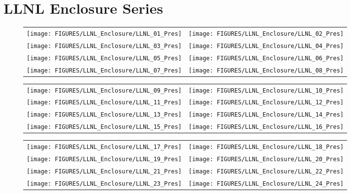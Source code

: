 \section{LLNL Enclosure Series}

\begin{figure}[p]
\begin{tabular*}{\textwidth}{l@{\extracolsep{\fill}}r}
\texttt{[image: FIGURES/LLNL\_Enclosure/LLNL\_01\_Pres]} &
\texttt{[image: FIGURES/LLNL\_Enclosure/LLNL\_02\_Pres]} \\
\texttt{[image: FIGURES/LLNL\_Enclosure/LLNL\_03\_Pres]} &
\texttt{[image: FIGURES/LLNL\_Enclosure/LLNL\_04\_Pres]} \\
\texttt{[image: FIGURES/LLNL\_Enclosure/LLNL\_05\_Pres]} &
\texttt{[image: FIGURES/LLNL\_Enclosure/LLNL\_06\_Pres]} \\
\texttt{[image: FIGURES/LLNL\_Enclosure/LLNL\_07\_Pres]} &
\texttt{[image: FIGURES/LLNL\_Enclosure/LLNL\_08\_Pres]}
\end{tabular*}
\label{LLNL_Enclosure_Pres_1}
\end{figure}

\begin{figure}[p]
\begin{tabular*}{\textwidth}{l@{\extracolsep{\fill}}r}
\texttt{[image: FIGURES/LLNL\_Enclosure/LLNL\_09\_Pres]} &
\texttt{[image: FIGURES/LLNL\_Enclosure/LLNL\_10\_Pres]} \\
\texttt{[image: FIGURES/LLNL\_Enclosure/LLNL\_11\_Pres]} &
\texttt{[image: FIGURES/LLNL\_Enclosure/LLNL\_12\_Pres]} \\
\texttt{[image: FIGURES/LLNL\_Enclosure/LLNL\_13\_Pres]} &
\texttt{[image: FIGURES/LLNL\_Enclosure/LLNL\_14\_Pres]} \\
\texttt{[image: FIGURES/LLNL\_Enclosure/LLNL\_15\_Pres]} &
\texttt{[image: FIGURES/LLNL\_Enclosure/LLNL\_16\_Pres]}
\end{tabular*}
\label{LLNL_Enclosure_Pres_2}
\end{figure}

\begin{figure}[p]
\begin{tabular*}{\textwidth}{l@{\extracolsep{\fill}}r}
\texttt{[image: FIGURES/LLNL\_Enclosure/LLNL\_17\_Pres]} &
\texttt{[image: FIGURES/LLNL\_Enclosure/LLNL\_18\_Pres]} \\
\texttt{[image: FIGURES/LLNL\_Enclosure/LLNL\_19\_Pres]} &
\texttt{[image: FIGURES/LLNL\_Enclosure/LLNL\_20\_Pres]} \\
\texttt{[image: FIGURES/LLNL\_Enclosure/LLNL\_21\_Pres]} &
\texttt{[image: FIGURES/LLNL\_Enclosure/LLNL\_22\_Pres]} \\
\texttt{[image: FIGURES/LLNL\_Enclosure/LLNL\_23\_Pres]} &
\texttt{[image: FIGURES/LLNL\_Enclosure/LLNL\_24\_Pres]}
\end{tabular*}
\label{LLNL_Enclosure_Pres_3}
\end{figure}

